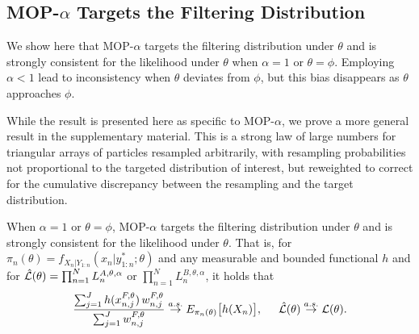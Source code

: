 \documentclass[numsec,webpdf,modern,medium,namedate]{oup-authoring-template}
\newcommand\arxiv[2]{#2} %
\theoremstyle{thmstyleone}%
\theoremstyle{thmstyletwo}%
\theoremstyle{thmstylethree}%
\begin{document}
\subsection{MOP-$\alpha$ Targets the Filtering Distribution}


We show here that MOP-$\alpha$ targets the filtering distribution under $\theta$ and is strongly consistent for the likelihood under $\theta$ when $\alpha=1$ or $\theta=\phi$.
Employing $\alpha<1$ lead to inconsistency when $\theta$ deviates from $\phi$, but this bias disappears as $\theta$ approaches $\phi$.

While the result is presented here as specific to MOP-$\alpha$, we prove a more general result in \arxiv{Appendix~\ref{appendix:targeting}}{the supplementary material}.
This is a strong law of large numbers for triangular arrays of particles resampled arbitrarily, with resampling probabilities not proportional to the targeted distribution of interest, but reweighted to correct for the cumulative discrepancy between the resampling and the target distribution.


\begin{thm}
    \label{thm:mop-targeting}
    When $\alpha=1$ or $\theta=\phi$, MOP-$\alpha$ targets the filtering distribution under $\theta$ and is strongly consistent for the likelihood under $\theta$. That is, for $\pi_n(\theta)=f_{X_{n}|Y_{1:n}}(x_n|y_{1:n}^* ; \theta)$ and any measurable and bounded functional $h$ and for $\hat{\mathcal{L}}(\theta) = \prod_{n=1}^N L_n^{A,\theta,\alpha}$ or $\prod_{n=1}^N L_n^{B,\theta,\alpha}$, it holds that
    \arxiv{}{\vspace*{-1.5mm}}
    \begin{equation} \nonumber
        \frac{\sum_{j=1}^J h(x_{n,j}^{F, \theta}) \, w_{n,j}^{F,\theta}}{\sum_{j=1}^J w_{n,j}^{F,\theta}} \stackrel{a.s.}{\to} E_{\pi_n(\theta)} \big[h(X_n)\big], \hspace{5mm} \hat\lik(\theta)  \stackrel{a.s.}{\to} \lik(\theta).
    \arxiv{}{\vspace*{-1.5mm}}
    \end{equation}
\end{thm}
\end{document}

